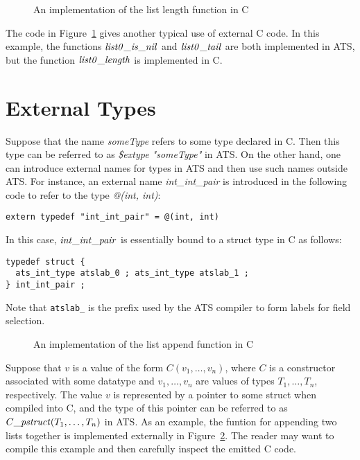 \begin{figure}

\caption{An implementation of the list length function in C}
\label{figure:external_list0_length_function}
\end{figure}
The code in Figure~\ref{figure:external_list0_length_function} gives
another typical use of external C code. In this example, the functions
${\it list0\_is\_nil}$ and ${\it list0\_tail}$ are both implemented in
ATS, but the function ${\it list0\_length}$ is implemented in C.

\section{External Types}
Suppose that the name {\it someType} refers to some type declared in C.  Then
this type can be referred to as {\it \$extype "someType"} in ATS. On the
other hand, one can introduce external names for types in ATS and then use
such names outside ATS. For instance, an external name {\it
int\_int\_pair} is introduced in the following code to refer to the type
{\it @(int, int)}:
\begin{verbatim}
extern typedef "int_int_pair" = @(int, int)
\end{verbatim}
In this case, ${\it int\_int\_pair}$ is essentially bound to a struct type
in C as follows:
\begin{verbatim}
typedef struct {
  ats_int_type atslab_0 ; ats_int_type atslab_1 ;
} int_int_pair ;
\end{verbatim}
Note that \verb`atslab_` is the prefix used by the ATS compiler to form
labels for field selection.

\begin{figure}

\caption{An implementation of the list append function in C}
\label{figure:external_list0_append_function}
\end{figure}
Suppose that $v$ is a value of the form $C(v_1,\ldots, v_n)$, where $C$ is
a constructor associated with some datatype and $v_1,\ldots,v_n$ are values
of types $T_1,\ldots, T_n$, respectively. The value $v$ is represented by a
pointer to some struct when compiled into C, and the type of this pointer
can be referred to as $C\_{\it pstruct}(T_1,\ldots, T_n)$ in ATS. As an
example, the funtion for appending two lists together is implemented
externally in Figure~\ref{figure:external_list0_append_function}. The
reader may want to compile this example and then carefully inspect the
emitted C code.


